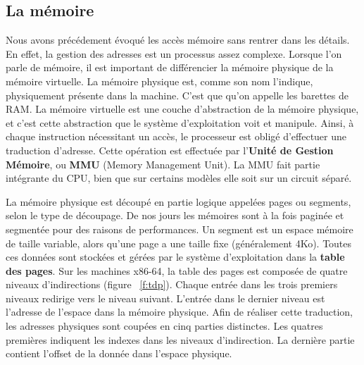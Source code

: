     \subsection{La mémoire}

      Nous avons précédement évoqué les accès mémoire sans rentrer dans les
      détails. En effet, la gestion des adresses est un processus assez
      complexe. Lorsque l'on parle de mémoire, il est important de différencier
      la mémoire physique de la mémoire virtuelle. La mémoire physique est,
      comme son nom l'indique, physiquement présente dans la machine. C'est que
      qu'on appelle les \og barettes de RAM\fg. La mémoire virtuelle est une
      couche d'abstraction de la mémoire physique, et c'est cette abstraction
      que le système d'exploitation voit et manipule. Ainsi, à chaque
      instruction nécessitant un accès, le processeur est obligé d'effectuer une
      traduction d'adresse. Cette opération est effectuée par l'\textbf{Unité de
        Gestion Mémoire}, ou \textbf{MMU} (Memory Management Unit). La MMU fait
      partie intégrante du CPU, bien que sur certains modèles elle soit sur un
      circuit séparé.\newline


      La mémoire physique est découpé en partie logique appelées pages ou
      segments, selon le type de découpage. De nos jours les mémoires sont à la
      fois paginée et segmentée pour des raisons de performances. Un segment est
      un espace mémoire de taille variable, alors qu'une page a une taille fixe
      (généralement 4Ko). Toutes ces données sont stockées et gérées par le
      système d'exploitation dans la \textbf{table des pages}. Sur les machines
      x86-64, la table des pages est composée de quatre niveaux d'indirections
      (figure ~\ref{f:tdp}). Chaque entrée dans les trois premiers niveaux
      redirige vers le niveau suivant. L'entrée dans le dernier niveau est
      l'adresse de l'espace dans la mémoire physique. Afin de réaliser cette
      traduction, les adresses physiques sont coupées en cinq parties
      distinctes. Les quatres premières indiquent les indexes dans les niveaux
      d'indirection. La dernière partie contient l'offset de la donnée dans
      l'espace physique.
    

